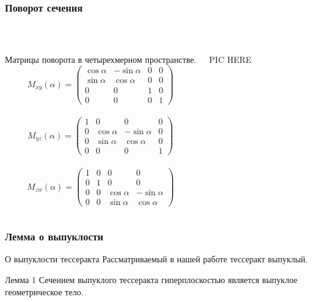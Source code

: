 \documentclass[10pt,pdf,hyperref={unicode}]{beamer}
\begin{document}
\begin{frame}
	\frametitle{Поворот сечения}	\\

	\begin{columns}
	\begin{block}{Матрицы поворота в четырехмерном пространстве.}
		{\footnotesize
			$$
			M_{xy}(\alpha)=
			\left(
			\begin{array}{cccc}
				\cos \alpha & -\sin \alpha & 0 & 0 \\
				\sin \alpha & \cos \alpha & 0 & 0 \\
				0 & 0 & 1 & 0 \\
				0 & 0 & 0 & 1
			\end{array}\right)
			$$			\\
			
			\newline
			$$
			M_{yz}(\alpha)=
			\left(
			\begin{array}{cccc}
				1 & 0 & 0 & 0 \\
				0 & \cos \alpha & -\sin \alpha & 0 \\
				0 & \sin \alpha & \cos \alpha & 0 \\
				0 & 0 & 0 & 1
			\end{array}\right)
			$$			\\ 

			$$
			M_{zw}(\alpha)=
			\left(
			\begin{array}{cccc}
				1 & 0 & 0 & 0 \\
				0 & 1 & 0 & 0 \\
				0 & 0 & \cos \alpha & -\sin \alpha \\
				0 & 0 & \sin \alpha & \cos \alpha
			\end{array}\right)
			$$
		}

\end{block}
PIC HERE
\end{columns}
\end{frame}

\begin{frame}
	\frametitle{Лемма о выпуклости}

	\begin{alertblock}{О выпуклости тессеракта}
		Рассматриваемый в нашей работе тессеракт выпуклый.
	\end{alertblock}

	\begin{block}{Лемма 1}
		Сечением выпуклого тессеракта гиперплоскостью является выпуклое геометрическое тело.
	\end{block}
\end{frame}
\end{document}

